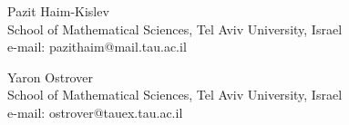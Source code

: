 \documentclass[10pt,a4paper]{article}
\theoremstyle{definition}
\begin{document}




\vskip10pt

\noindent Pazit Haim-Kislev \\
\noindent School of Mathematical Sciences, Tel Aviv University, Israel \\
\noindent e-mail: pazithaim@mail.tau.ac.il
\vskip 10pt


\noindent Yaron Ostrover \\
\noindent School of Mathematical Sciences, Tel Aviv University, Israel \\
\noindent e-mail: ostrover@tauex.tau.ac.il
\end{document}
